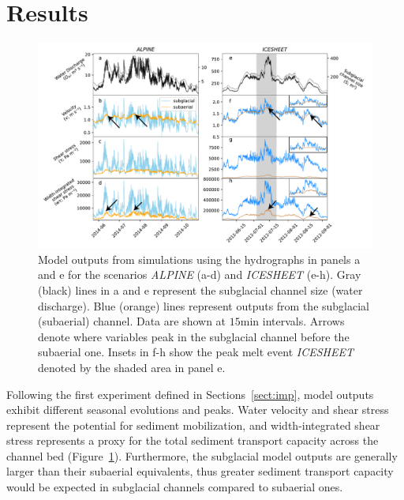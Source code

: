 \documentclass[draft]{agujournal2019}
\newcommand{\alpine}{\textit{ALPINE}}
\newcommand{\icesheet}{\textit{ICESHEET}}
\newcommand{\unit}[1]{$\mathrm{#1}$}
\begin{document}
\section{Results}
\begin{figure}[h]
  \centering
  \includegraphics[width=0.9\linewidth]{Fig2.pdf}
  \caption{Model outputs from simulations using the hydrographs in panels a and e for the scenarios \alpine{} (a-d) and \icesheet{} (e-h).
    Gray (black) lines in a and e represent the subglacial channel size (water discharge).
    Blue (orange) lines represent outputs from the subglacial (subaerial) channel.
    Data are shown at $15$\unit{min} intervals.
    Arrows denote where variables peak in the subglacial channel before the subaerial one.
    Insets in f-h show the  peak melt event \icesheet{} denoted by the shaded area in panel e.
  }
  \label{fig:model_outs}
\end{figure}

Following the first experiment defined in Sections~\ref{sect:imp}, model outputs exhibit different seasonal evolutions and peaks.
Water velocity and shear stress represent the potential for sediment mobilization, and width-integrated shear stress represents a proxy for the total sediment transport capacity across the channel bed (Figure~\ref{fig:model_outs}).
Furthermore, the subglacial model outputs are generally larger than their subaerial equivalents, thus greater sediment transport capacity would be expected in subglacial channels compared to subaerial ones.
\end{document}
